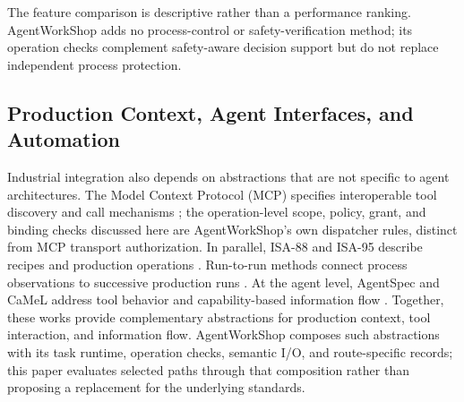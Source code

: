 The feature comparison is descriptive rather than a performance ranking.
AgentWorkShop adds no process-control or safety-verification method; its
operation checks complement safety-aware decision support
\cite{jiang2026agentic} but do not replace independent process protection.

\subsection{Production Context, Agent Interfaces, and Automation}
Industrial integration also depends on abstractions that are not specific to
agent architectures. The Model Context Protocol (MCP) specifies interoperable
tool discovery and call mechanisms \cite{mcp2024}; the operation-level scope,
policy, grant, and binding checks discussed here are AgentWorkShop's own
dispatcher rules, distinct from MCP transport authorization. In parallel,
ISA-88 and ISA-95 describe recipes and production operations
\cite{isa88_2010,isa95_2025}. Run-to-run methods connect process observations
to successive production runs \cite{moyne2000r2r}. At the agent level,
AgentSpec and CaMeL address tool behavior and capability-based information
flow \cite{wang2025agentspec,debenedetti2025camel}. Together, these works
provide complementary abstractions for production context, tool interaction,
and information flow. AgentWorkShop composes such abstractions with its task
runtime, operation checks, semantic I/O, and route-specific records; this
paper evaluates selected paths through that composition rather than proposing
a replacement for the underlying standards.

